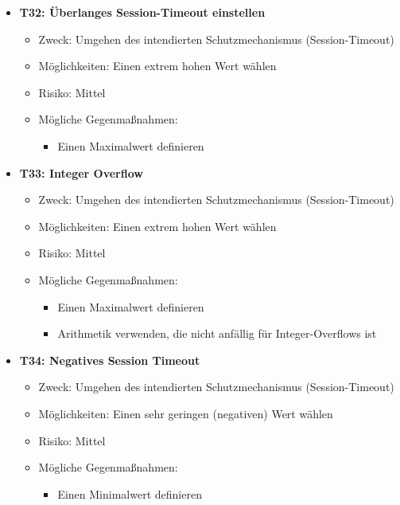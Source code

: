 \documentclass[12pt,DIV14,BCOR10mm,a4paper,parskip=half-,headsepline,headinclude,english,ngerman,bibliography=totocnumbered]{scrreprt}
\begin{document}
\begin{itemize}

  \hypertarget{threat32}{}
  \item \textbf{T32: Überlanges Session-Timeout einstellen}
  \begin{itemize}
    \item Zweck: Umgehen des intendierten Schutzmechanismus (Session-Timeout)
    \item Möglichkeiten: Einen extrem hohen Wert wählen
    \item Risiko: Mittel
    \item Mögliche Gegenmaßnahmen:
      \begin{itemize}
      \item Einen Maximalwert definieren
      \end{itemize}
  \end{itemize}

  \hypertarget{threat33}{}
  \item \textbf{T33: Integer Overflow}
  \begin{itemize}
    \item Zweck: Umgehen des intendierten Schutzmechanismus (Session-Timeout)
    \item Möglichkeiten: Einen extrem hohen Wert wählen
    \item Risiko: Mittel
    \item Mögliche Gegenmaßnahmen:
      \begin{itemize}
      \item Einen Maximalwert definieren
      \item Arithmetik verwenden, die nicht anfällig für Integer-Overflows ist
      \end{itemize}
  \end{itemize}

  \hypertarget{threat34}{}
  \item \textbf{T34: Negatives Session Timeout}
  \begin{itemize}
    \item Zweck: Umgehen des intendierten Schutzmechanismus (Session-Timeout)
    \item Möglichkeiten: Einen sehr geringen (negativen) Wert wählen
    \item Risiko: Mittel
    \item Mögliche Gegenmaßnahmen:
      \begin{itemize}
      \item Einen Minimalwert definieren
      \end{itemize}
  \end{itemize}
\end{itemize}
\end{document}
